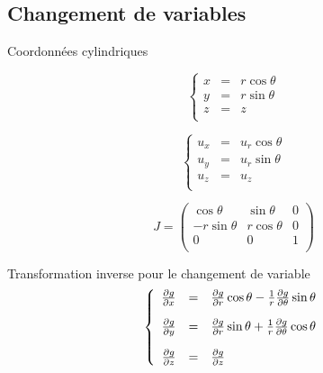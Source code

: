 \documentclass[french]{beamer}
\begin{document}
\subsection{Changement de variables} 
\begin{frame}{Coordonnées cylindriques}
  \begin{minipage}{0.48\textwidth}
    \begin{equation*}
      \left \{
	\begin{array}{ccc}
	  x & = &r \cos \theta  \\
	  y & = &r \sin \theta   \\
	  z & = &z \\
	\end{array}
	\right.
      \end{equation*}
    \end{minipage}
    \begin{minipage}{0.48\textwidth}
      \begin{equation}
	\left \{
	  \begin{array}{ccc}
	    u_x & = &u_r \cos \theta  \\
	    u_y & = &u_r \sin \theta   \\
	    u_z & = &u_z \\
	  \end{array}
	  \right.
	\end{equation}
      \end{minipage}
      \pause
    \vspace{23pt}
  \begin{equation}
    J  =  
    \left(
    \begin{array}{ccc}
         \cos \theta &  \sin \theta & 0 \\
      -r \sin \theta &r \cos \theta & 0 \\
                          0 & 0 & 1 \\
    \end{array}
    \right)
  \end{equation}
\end{frame}

\begin{frame}{Transformation inverse pour le changement de variable}
\begin{equation}
    \left \{
      \begin{array}{rcl}
	\frac{\partial g}{\partial x} & = & \frac{\partial g}{\partial r} 
	\cos \theta - \frac{1}{r} \frac{\partial{g}}{\partial \theta} \sin \theta 
	\vspace{10pt} \\
	\frac{\partial g}{\partial y} & = & \frac{\partial g}{\partial r} 
	\sin \theta + \frac{1}{r} \frac{\partial{g}}{\partial \theta} \cos \theta
	\vspace{10pt} \\
	\frac{\partial g}{\partial z} & = & \frac{\partial g}{\partial z}\\
      \end{array}
      \right.
    \end{equation}
\end{frame}
\end{document}
